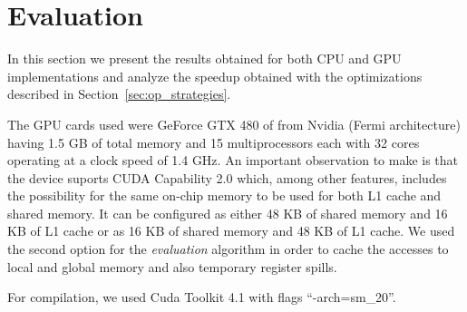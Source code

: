 \section{Evaluation}

In this section we present the results obtained for both CPU and GPU
implementations and analyze the speedup obtained with the optimizations
described in Section~\ref{sec:op_strategies}.

The GPU cards used were GeForce GTX 480 of from Nvidia (Fermi architecture)
having 1.5 GB of total memory and 15 multiprocessors each with 32 cores
operating at a clock speed of 1.4 GHz. An important observation to make is that
the device suports CUDA Capability 2.0 which, among other features, includes the
possibility for the same on-chip memory to be used for both L1 cache and shared
memory. It can be configured as either 48 KB of shared memory and 16 KB of L1
cache or as 16 KB of shared memory and 48 KB of L1 cache. We used the second
option for the \textit{evaluation} algorithm in order to cache the accesses to
local and global memory and also temporary register spills.

For compilation, we used Cuda Toolkit 4.1 with flags ``-arch=sm\_20''.
